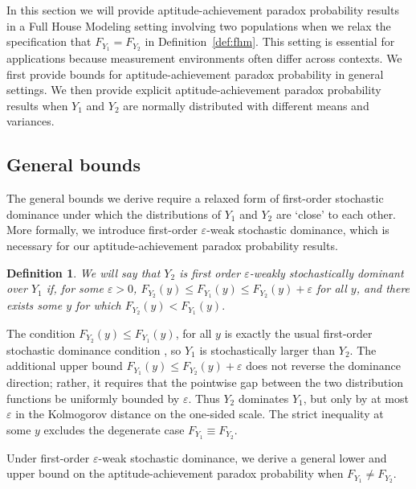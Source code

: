 \documentclass[12pt]{article}
\newtheorem{defn}[theorem]{Definition}
\begin{document}
In this section we will provide aptitude-achievement paradox probability results in a Full House Modeling setting involving two populations when we relax the specification that $F_{Y_1} = F_{Y_2}$ in Definition~\ref{def:fhm}. This setting is essential for applications because measurement environments often differ across contexts. We first provide bounds for aptitude-achievement paradox probability in general settings. We then provide explicit aptitude-achievement paradox probability results when $Y_1$ and $Y_2$ are normally distributed with different means and variances.

\subsection{General bounds}

The general bounds we derive require a relaxed form of first-order stochastic dominance under which the distributions of $Y_1$ and $Y_2$ are `close' to each other. More formally, we introduce first-order $\varepsilon$-weak stochastic dominance, which is necessary for our aptitude-achievement paradox probability results.

\begin{defn}\label{def:stodom}
We will say that $Y_2$ is first order $\varepsilon$-weakly stochastically dominant over $Y_1$ if, for some $\varepsilon > 0$, 
$
  F_{Y_2}(y) \leq F_{Y_1}(y) \leq F_{Y_2}(y) + \varepsilon
$
for all $y$, and there exists some $y$ for which 
$
  F_{Y_2}(y) < F_{Y_1}(y).
$
\end{defn}

The condition $F_{Y_2}(y)\le F_{Y_1}(y)$, for all $y$ is exactly the usual first-order stochastic dominance condition \citep{quirk1962admissibility}, so $Y_1$ is stochastically larger than $Y_2$. The additional upper bound $F_{Y_1}(y)\le F_{Y_2}(y)+\varepsilon$ does not reverse the dominance direction; rather, it requires that the pointwise gap between the two distribution functions be uniformly bounded by $\varepsilon$. Thus $Y_2$ dominates $Y_1$, but only by at most $\varepsilon$ in the Kolmogorov distance on the one-sided scale. The strict inequality at some $y$ excludes the degenerate case $F_{Y_1}\equiv F_{Y_2}$.

Under first-order $\varepsilon$-weak stochastic dominance, we derive a general lower and upper bound on the aptitude-achievement paradox probability when $F_{Y_1}\neq F_{Y_2}$.
\end{document}
